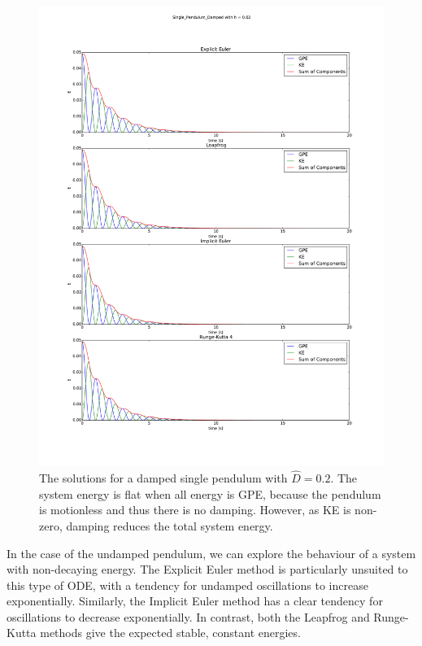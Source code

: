 \documentclass{article}
\begin{document}
\begin{figure}
\begin{center}
\includegraphics[height=0.9\textheight]{Single_Pendulum_Damped_Energy_Components}
\caption{The solutions for a damped single pendulum with $\hat{D}=0.2$. The system energy is flat when all energy is GPE, because the pendulum is motionless and thus there is no damping. However, as KE is non-zero, damping reduces the total system energy.}
\label{fig:singledampedenergy}
\end{center}
\end{figure}

In the case of the undamped pendulum, we can explore the behaviour of a system with non-decaying energy. The Explicit Euler method is particularly unsuited to this type of ODE, with a tendency for undamped oscillations to increase exponentially. Similarly, the Implicit Euler method has a clear tendency for oscillations to decrease exponentially. In contrast, both the Leapfrog and Runge-Kutta methods give the expected stable, constant energies.
\end{document}
